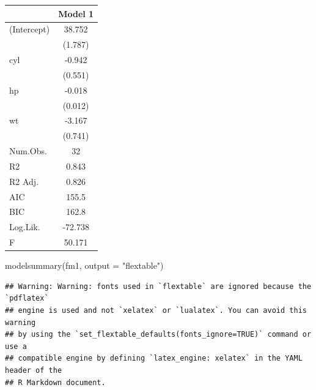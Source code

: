 \documentclass[
]{book}
\newenvironment{Shaded}{\begin{snugshade}}{\end{snugshade}}
\newcommand{\AttributeTok}[1]{\textcolor[rgb]{0.77,0.63,0.00}{#1}}
\newcommand{\FunctionTok}[1]{\textcolor[rgb]{0.00,0.00,0.00}{#1}}
\newcommand{\NormalTok}[1]{#1}
\newcommand{\StringTok}[1]{\textcolor[rgb]{0.31,0.60,0.02}{#1}}
\theoremstyle{definition}
\theoremstyle{definition}
\theoremstyle{definition}
\theoremstyle{definition}
\theoremstyle{remark}
\begin{document}
\begin{table}
\centering
\begin{tabular}[t]{lc}
\toprule
  & Model 1\\
\midrule
(Intercept) & 38.752\\
 & (1.787)\\
cyl & -0.942\\
 & (0.551)\\
hp & -0.018\\
 & (0.012)\\
wt & -3.167\\
 & (0.741)\\
\midrule
Num.Obs. & 32\\
R2 & 0.843\\
R2 Adj. & 0.826\\
AIC & 155.5\\
BIC & 162.8\\
Log.Lik. & -72.738\\
F & 50.171\\
\bottomrule
\end{tabular}
\end{table}

\begin{Shaded}
\begin{Highlighting}[]
\FunctionTok{modelsummary}\NormalTok{(fm1, }\AttributeTok{output =} \StringTok{"flextable"}\NormalTok{)}
\end{Highlighting}
\end{Shaded}

\begin{verbatim}
## Warning: Warning: fonts used in `flextable` are ignored because the `pdflatex`
## engine is used and not `xelatex` or `lualatex`. You can avoid this warning
## by using the `set_flextable_defaults(fonts_ignore=TRUE)` command or use a
## compatible engine by defining `latex_engine: xelatex` in the YAML header of the
## R Markdown document.
\end{verbatim}

\providecommand{\docline}[3]{\noalign{\global\setlength{\arrayrulewidth}{#1}}\arrayrulecolor[HTML]{#2}\cline{#3}}

\setlength{\tabcolsep}{2pt}

\renewcommand*{\arraystretch}{1.5}
\end{document}
